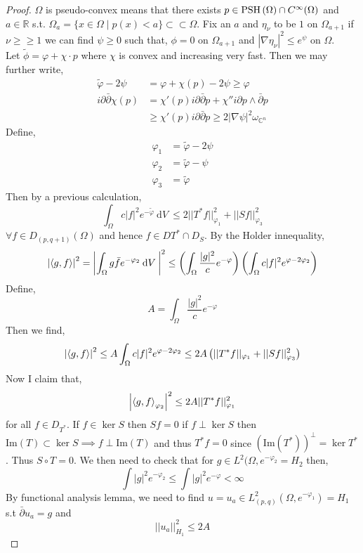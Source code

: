\documentclass[12pt]{extarticle}
\newcommand{\R}{\mathbb{R}}
\newcommand{\C}{\mathbb{C}}
\renewcommand{\Im}[1]{\mathrm{Im}(#1)}
\renewcommand{\d}[1]{\: \mathrm{d}#1 \:}
\theoremstyle{definition}
\begin{document}
\begin{proof}
$\Omega$ is pseudo-convex means that there exists $p \in \mathrm{PSH}\left( \Omega \right) \cap C^\infty(\Omega)$ and $a \in \R$ s.t. $\Omega_a = \{ x \in \Omega \mid p(x) < a \} \subset \subset \Omega$. Fix an $a$ and $\eta_\nu$ to be $1$ on $\Omega_{a + 1}$ if $\nu \ge \ge 1$ we can find $\psi \ge 0$ such that, $\phi = 0$ on $\Omega_{a+1}$ and $|\nabla \eta_\nu|^2 \le e^\psi$ on $\Omega$. 
\bigskip\\
Let $\tilde{\phi} = \varphi + \chi \cdot p$ where $\chi$ is convex and increasing very fast. Then we may further write,
\begin{align*}
\tilde{\varphi} - 2 \psi & = \varphi + \chi(p) - 2 \psi \ge \varphi 
\\
i \partial \bar{\partial} \chi(p) & = \chi'(p) i \partial \bar{\partial} p + \chi'' i \partial p \wedge \bar{\partial} p 
\\
& \ge \chi'(p) i \partial \bar{\partial} p \ge 2 | \nabla \psi |^2 \omega_{\C^n} 
\end{align*}
Define,
\begin{align*}
\varphi_1 & = \tilde{\varphi} - 2 \psi
\\
\varphi_2 & = \tilde{\varphi} - \psi
\\
\varphi_3 & = \tilde{\varphi}
\end{align*}
Then by a previous calculation,
\[ \int_\Omega c |f|^2 e^{-\tilde{\varphi}} \d{V} \le 2 || T^* f ||^2_{\varphi_1} + || S f ||^2_{\varphi_3} \]
$\forall f \in D_{(p, q+1)}(\Omega)$ and hence $f \in D{T^*} \cap D_S$. By the Holder innequality,
\begin{align*}
\left| \inner{g}{f} \right|^2 = \left| \int_\Omega g \bar{f} e^{-\varphi_2} \d{V} \right|^2 \le \left( \int_\Omega \frac{|g|^2}{c} e^{-\varphi} \right) \left( \int_\Omega c | f |^2 e^{\varphi - 2 \varphi_2} \right) 
\end{align*}
Define,
\[ A = \int_\Omega \frac{|g|^2}{c} e^{-\varphi}  \]
Then we find,
\[ \left| \left< g, f \right> \right|^2 \le A \int_\Omega c |f|^2 e^{\varphi - 2 \varphi_2} \le 2 A \left( || T^* f ||_{\varphi_1} + || S f ||^2_{\varphi_3} \right) \]
Now I claim that,
\[ \left| \left< g, f \right>_{\varphi_2} \right|^2 \le 2 A || T^* f ||_{\varphi_1}^2 \]
for all $f \in D_{T^*}$. If $f \in \ker{S}$ then $S f = 0$ if $f \perp \ker{S}$ then $\Im{T} \subset \ker{S} \implies f \perp \Im{T}$ and thus $T^* f = 0$ since $(\Im{T^*})^\perp = \ker{T^*}$. Thus $S \circ T = 0$. We then need to check that for $g \in L^2(\Omega, e^{-\varphi_2} = H_2$ then,
\[ \int |g|^2 e^{-\varphi_2} \le \int |g|^2 e^{-\varphi} < \infty \]
By functional analysis lemma, we need to find $u = u_a \in L^2_{(p,q)}(\Omega, e^{-\varphi_1}) = H_1$ s.t $\bar{\partial} u_a = g$ and 
\[ || u_a ||^2_{H_1} \le 2 A \] 
\end{proof}
\end{document}

